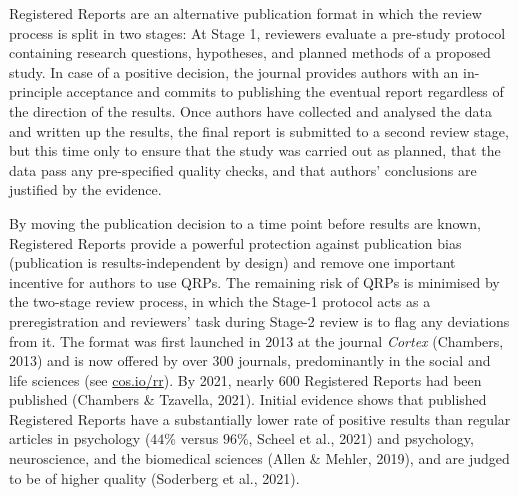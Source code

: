 \documentclass[british,,man,mask,floatsintext]{apa6}
\begin{document}
Registered Reports are an alternative publication format in which the review process is split in two stages:
At Stage 1, reviewers evaluate a pre-study protocol containing research questions, hypotheses, and planned methods of a proposed study.
In case of a positive decision, the journal provides authors with an in-principle acceptance and commits to publishing the eventual report regardless of the direction of the results.
Once authors have collected and analysed the data and written up the results, the final report is submitted to a second review stage, but this time only to ensure that the study was carried out as planned, that the data pass any pre-specified quality checks, and that authors' conclusions are justified by the evidence.

By moving the publication decision to a time point before results are known, Registered Reports provide a powerful protection against publication bias (publication is results-independent by design) and remove one important incentive for authors to use QRPs.
The remaining risk of QRPs is minimised by the two-stage review process, in which the Stage-1 protocol acts as a preregistration and reviewers' task during Stage-2 review is to flag any deviations from it.
The format was first launched in 2013 at the journal \emph{Cortex} (Chambers, 2013) and is now offered by over 300 journals, predominantly in the social and life sciences (see \url{cos.io/rr}).
By 2021, nearly 600 Registered Reports had been published (Chambers \& Tzavella, 2021).
Initial evidence shows that published Registered Reports have a substantially lower rate of positive results than regular articles in psychology (\(44\%\) versus \(96\%\), Scheel et al., 2021) and psychology, neuroscience, and the biomedical sciences (Allen \& Mehler, 2019), and are judged to be of higher quality (Soderberg et al., 2021).
\end{document}
